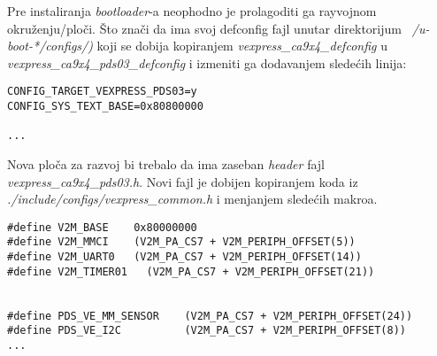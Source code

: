 \documentclass{article}
\begin{document}
Pre instaliranja \textit{bootloader}-a neophodno je prolagoditi ga rayvojnom okruženju/ploči. Što znači da ima svoj defconfig fajl unutar direktorijum \textit{~/u-boot-*/configs/)} koji se dobija kopiranjem \textit{vexpress\_ca9x4\_defconfig} u \textit{vexpress\_ca9x4\_pds03\_defconfig} i izmeniti ga dodavanjem sledećih linija:



\begin{file}
\begin{verbatim}
CONFIG_TARGET_VEXPRESS_PDS03=y
CONFIG_SYS_TEXT_BASE=0x80800000

...
\end{verbatim}
\end{file}



Nova ploča za razvoj bi trebalo da ima zaseban \textit{header} fajl \textit{vexpress\_ca9x4\_pds03.h}. Novi fajl je dobijen kopiranjem koda iz \textit{./include/configs/vexpress\_common.h} i menjanjem sledećih makroa.

\begin{file}
\begin{verbatim}
#define V2M_BASE    0x80000000
#define V2M_MMCI    (V2M_PA_CS7 + V2M_PERIPH_OFFSET(5))
#define V2M_UART0   (V2M_PA_CS7 + V2M_PERIPH_OFFSET(14))
#define V2M_TIMER01   (V2M_PA_CS7 + V2M_PERIPH_OFFSET(21))


#define PDS_VE_MM_SENSOR 	(V2M_PA_CS7 + V2M_PERIPH_OFFSET(24))
#define PDS_VE_I2C  		(V2M_PA_CS7 + V2M_PERIPH_OFFSET(8))
...
\end{verbatim}
\end{file}
\end{document}
